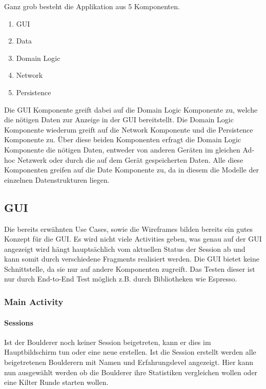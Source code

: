 \documentclass[11pt,a4paper,headsepline,footsepline,bibliography=totocnumbered]{article}
\newcommand{\subsubsubsection}[1]{\paragraph{#1}\mbox{}}
\begin{document}
  \par
    Ganz grob besteht die Applikation aus 5 Komponenten.
    \begin{enumerate}
      \item GUI
      \item Data
      \item Domain Logic
      \item Network
      \item Persistence
    \end{enumerate}
    Die GUI Komponente greift dabei auf die Domain Logic Komponente zu, welche die nötigen Daten zur Anzeige in der GUI bereitstellt.
    Die Domain Logic Komponente wiederum greift auf die Network Komponente und die Persistence Komponente zu.
    Über diese beiden Komponenten erfragt die Domain Logic Komponente die nötigen Daten, entweder von anderen Geräten im gleichen Ad-hoc Netzwerk oder durch die auf dem Gerät gespeicherten Daten.
    Alle diese Komponenten greifen auf die Date Komponente zu, da in diesem die Modelle der einzelnen Datenstrukturen liegen.

  \subsection{GUI}
    \par
      Die bereits erwähnten Use Cases, sowie die Wireframes bilden bereits ein gutes Konzept für die GUI.
      Es wird nicht viele Activities geben, was genau auf der GUI angezeigt wird hängt hauptsächlich vom aktuellen Status der Session ab und kann somit durch verschiedene Fragments realisiert werden.
      Die GUI bietet keine Schnittstelle, da sie nur auf andere Komponenten zugreift.
      Das Testen dieser ist nur durch End-to-End Test möglich z.B. durch Bibliotheken wie Espresso.

    \newpage
    \subsubsection{Main Activity}

      \subsubsubsection{Sessions}
        \par
          Ist der Boulderer noch keiner Session beigetreten, kann er dies im Hauptbildschirm tun oder eine neue erstellen.
          Ist die Session erstellt werden alle beigetretenen Boulderern mit Namen und Erfahrungslevel angezeigt.
          Hier kann nun ausgewählt werden ob die Boulderer ihre Statistiken vergleichen wollen oder eine Kilter Runde starten wollen.
\end{document}
